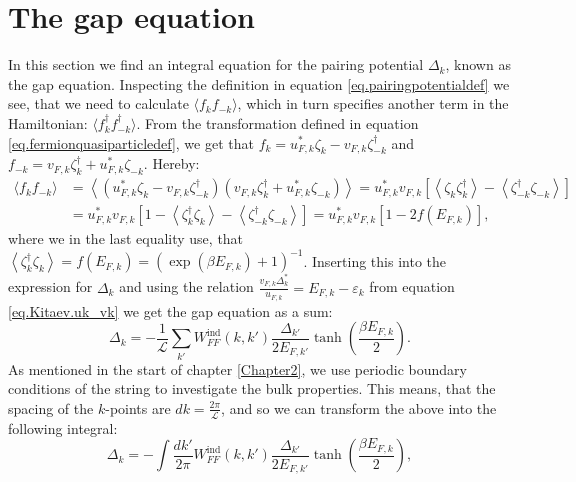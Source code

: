\section{The gap equation} \label{sec.pairingpotential.integralequation}
In this section we find an integral equation for the pairing potential $\Delta_k$, known as the gap equation. Inspecting the definition in equation \eqref{eq.pairingpotentialdef} we see, that we need to calculate $\langle f_k f_{-k} \rangle$, which in turn specifies another term in the Hamiltonian: $\langle f^\dagger_k f^\dagger_{-k} \rangle$. From the transformation defined in equation \eqref{eq.fermionquasiparticledef}, we get that $f_k = u^*_{F,k}\zeta_k - v_{F,k}\zeta^\dagger_{-k}$ and $f_{-k} = v_{F,k}\zeta^\dagger_k + u^*_{F,k}\zeta_{-k}$. Hereby:
\begin{align}
\langle f_k f_{-k} \rangle &= \left \langle (u^*_{F,k}\zeta_k - v_{F,k}\zeta^\dagger_{-k}) (v_{F,k}\zeta^\dagger_k + u^*_{F,k}\zeta_{-k}) \right \rangle = u^*_{F,k}v_{F,k}\left[ \left \langle \zeta_k \zeta^\dagger_{k} \right \rangle - \left \langle \zeta^\dagger_{-k} \zeta_{-k} \right \rangle \right]  \nonumber \\
& =  u^*_{F,k}v_{F,k}\left[ 1 - \left \langle \zeta^\dagger_{k} \zeta_k \right \rangle - \left \langle \zeta^\dagger_{-k} \zeta_{-k} \right \rangle \right] = u^*_{F,k}v_{F,k}\left[1 - 2f(E_{F,k})\right], \nonumber
\end{align}
where we in the last equality use, that $\left \langle \zeta^\dagger_{k} \zeta_{k} \right \rangle = f(E_{F,k})=(\exp(\beta E_{F,k})+1)^{-1} $. Inserting this into the expression for $\Delta_k$ and using the relation $\frac{v_{F,k}\Delta^*_k}{u_{F,k}}=E_{F,k}-\varepsilon_k$ from equation \eqref{eq.Kitaev.uk_vk} we get the gap equation as a sum:
\begin{equation}
\Delta_k = - \frac{1}{\mathcal{L}}\sum_{k'} W^\text{ind}_{FF}(k,k')\frac{\Delta_{k'}}{2E_{F,k'}}\tanh\left(\frac{\beta E_{F,k}}{2}\right).
\label{eq.GapequationSum}
\end{equation} 
As mentioned in the start of chapter \ref{Chapter2}, we use periodic boundary conditions of the string to investigate the bulk properties. This means, that the spacing of the $k$-points are $dk = \frac{2\pi}{\mathcal{L}}$, and so we can transform the above into the following integral:
\begin{equation}
\Delta_k = - \int \frac{dk'}{2\pi} W^\text{ind}_{FF}(k,k')\frac{\Delta_{k'}}{2E_{F,k'}}\tanh\left(\frac{\beta E_{F,k}}{2}\right), 
\label{eq.GapequationIntegral}
\end{equation} 
